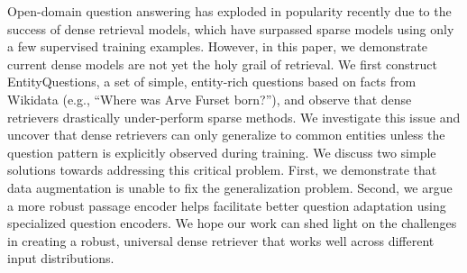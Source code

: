 Open-domain question answering has exploded in popularity recently due to the success of dense retrieval models, which have surpassed sparse models using only a few supervised training examples. However, in this paper, we demonstrate current dense models are not yet the holy grail of retrieval. We first construct EntityQuestions, a set of simple, entity-rich questions based on facts from Wikidata (e.g., ``Where  was  Arve  Furset  born?''), and observe that dense retrievers drastically under-perform sparse methods. We investigate this issue and uncover that dense retrievers can only generalize to common entities unless the question pattern is explicitly observed during training. We discuss two simple solutions towards addressing this critical problem. First, we demonstrate that data augmentation is unable to fix the generalization problem. Second, we argue a more robust passage encoder helps facilitate better question adaptation using specialized question encoders. We hope our work can shed light on the challenges in  creating a robust, universal dense retriever that works well across different input distributions.

